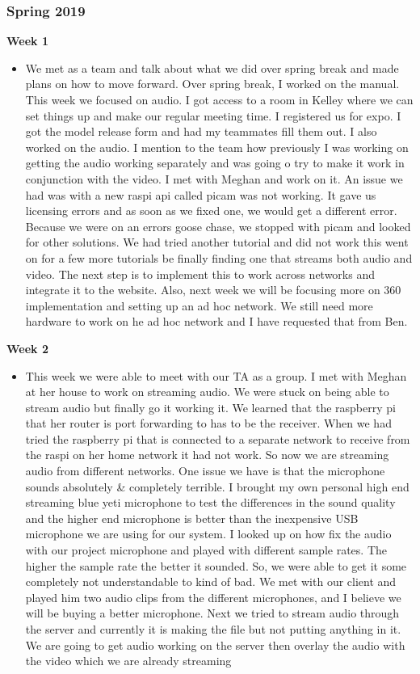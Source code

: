         \subsubsection{Spring 2019}
            \textbf{Week 1}
            \begin{itemize}
                \item We met as a team and talk about what we did over spring break and made plans on how to move forward. Over spring break, I worked on the manual. This week we focused on audio. I got access to a room in Kelley where we can set things up and make our regular meeting time. I registered us for expo. I got the model release form and had my teammates fill them out. I also worked on the audio. I mention to the team how previously I was working on getting the audio working separately and was going o try to make it work in conjunction with the video. I met with Meghan and work on it. An issue we had was with a new raspi api called picam was not working. It gave us licensing errors and as soon as we fixed one, we would get a different error. Because we were on an errors goose chase, we stopped with picam and looked for other solutions. We had tried another tutorial and did not work this went on for a few more tutorials be finally finding one that streams both audio and video. The next step is to implement this to work across networks and integrate it to the website. Also, next week we will be focusing more on 360 implementation and setting up an ad hoc network. We still need more hardware to work on he ad hoc network and I have requested that from Ben.
            \end{itemize}
            \newpage
            \textbf{Week 2}
            \begin{itemize}
                \item This week we were able to meet with our TA as a group. I met with Meghan at her house to work on streaming audio. We were stuck on being able to stream audio but finally go it working it. We learned that the raspberry pi that her router is port forwarding to has to be the receiver. When we had tried the raspberry pi that is connected to a separate network to receive from the raspi on her home network it had not work. So now we are streaming audio from different networks. One issue we have is that the microphone sounds absolutely & completely terrible. I brought my own personal high end streaming blue yeti microphone to test the differences in the sound quality and the higher end microphone is better than the inexpensive USB microphone we are using for our system. I looked up on how fix the audio with our project microphone and played with different sample rates. The higher the sample rate the better it sounded. So, we were able to get it some completely not understandable to kind of bad. We met with our client and played him two audio clips from the different microphones, and I believe we will be buying a better microphone. Next we tried to stream audio through the server and currently it is making the file but not putting anything in it. We are going to get audio working on the server then overlay the audio with the video which we are already streaming
            \end{itemize}
            
